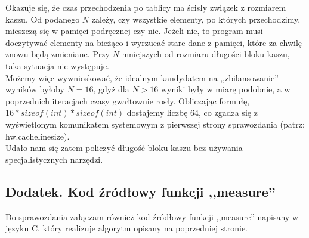 \documentclass{article}
\begin{document}
Okazuje się, że czas przechodzenia po tablicy ma ścisły związek z rozmiarem kaszu. Od podanego $N$ zależy, czy wszystkie elementy, po których przechodzimy, mieszczą się w pamięci podręcznej czy nie. Jeżeli nie, to program musi doczytywać elementy na bieżąco i wyrzucać stare dane z pamięci, które za chwilę znowu będą zmieniane. Przy $N$ mniejszych od rozmiaru długości bloku kaszu, taka sytuacja nie występuje. \\
 
Możemy więc wywnioskować, że idealnym kandydatem na ,,zbilansowanie'' wyników byłoby $N = 16$, gdyż dla $N > 16$ wyniki były w miarę podobnie, a w poprzednich iteracjach czasy gwałtownie rosły. Obliczając formułę, $16 * sizeof(int) * sizeof(int)$ dostajemy liczbę $64$, co zgadza się z wyświetlonym komunikatem systemowym z pierwszej strony sprawozdania (patrz: hw.cachelinesize). \\
 
Udało nam się zatem policzyć długość bloku kaszu bez używania specjalistycznych narzędzi.
 
\subsection*{Dodatek. Kod źródłowy funkcji ,,measure''}
 
Do sprawozdania załączam również kod źródłowy funkcji ,,measure'' napisany w języku C, który realizuje algorytm opisany na poprzedniej stronie.\\
 
\lstset{inputencoding=utf8}

 
 
 
\end{document}
